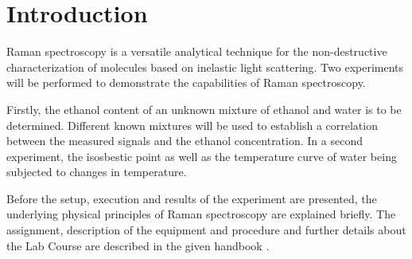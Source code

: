
\chapter{Introduction}
\label{chap:intro}

Raman spectroscopy is a versatile analytical technique for the non-destructive characterization of molecules based on inelastic light scattering. Two experiments will be performed to demonstrate the capabilities of Raman spectroscopy.

Firstly, the ethanol content of an unknown mixture of ethanol and water is to be determined. Different known mixtures will be used to establish a correlation between the measured signals and the ethanol concentration. In a second experiment, the isosbestic point as well as the temperature curve of water being subjected to changes in temperature.

Before the setup, execution and results of the experiment are presented, the underlying physical principles of Raman spectroscopy are explained briefly. The assignment, description of the equipment and procedure and further details about the Lab Course are described in the given handbook \autocite{brauerApplicationRamanSpectroscopy2022}.